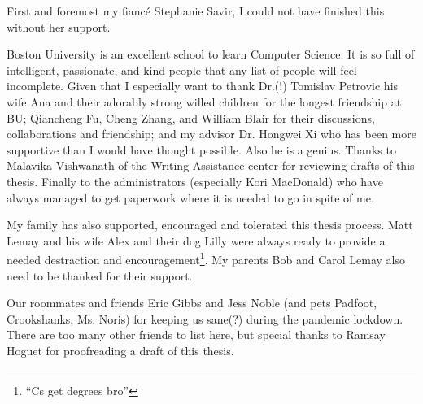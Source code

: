 First and foremost my fiancé Stephanie Savir, I could not have finished this without her support. %
 
Boston University is an excellent school to learn Computer Science.
It is so full of intelligent, passionate, and kind people that any list of people will feel incomplete.
Given that I especially want to thank Dr.(!) Tomislav Petrovic his wife Ana and their adorably strong willed children for the longest friendship at BU;
Qiancheng Fu, Cheng Zhang, and William Blair for their discussions, collaborations and friendship;
and my advisor Dr. Hongwei Xi who has been more supportive than I would have thought possible.
Also he is a genius.
Thanks to Malavika Vishwanath of the Writing Assistance center for reviewing drafts of this thesis.
Finally to the administrators (especially Kori MacDonald) who have always managed to get paperwork where it is needed to go in spite of me.

My family has also supported, encouraged and tolerated this thesis process.
Matt Lemay and his wife Alex and their dog Lilly were always ready to provide a needed destraction and encouragement\footnote{``Cs get degrees bro''}.
My parents Bob and Carol Lemay also need to be thanked for their support.

Our roommates and friends Eric Gibbs and Jess Noble (and pets Padfoot, Crookshanks, Ms. Noris) for keeping us sane(?) during the pandemic lockdown.
There are too many other friends to list here, but special thanks to Ramsay Hoguet for proofreading a draft of this thesis.


